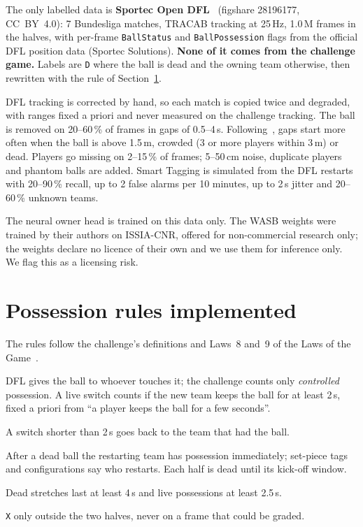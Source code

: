 \documentclass[11pt,a4paper]{article}
\newcommand{\code}[1]{\texttt{#1}}
\begin{document}
The only labelled data is \textbf{Sportec Open DFL}~\cite{dfl} (figshare 28196177, CC~BY~4.0): 7
Bundesliga matches, TRACAB tracking at 25\,Hz, 1.0\,M frames in the halves, with per-frame
\code{BallStatus} and \code{BallPossession} flags from the official DFL position data (Sportec
Solutions). \textbf{None of it comes from the challenge game.} Labels are \code{D} where the ball is
dead and the owning team otherwise, then rewritten with the rule of Section~\ref{sec:rules}.

DFL tracking is corrected by hand, so each match is copied twice and degraded, with ranges fixed a
priori and never measured on the challenge tracking. The ball is removed on 20--60\,\% of frames in
gaps of 0.5--4\,s. Following~\cite{rubin1976}, gaps start more often when the ball is above 1.5\,m,
crowded (3 or more players within 3\,m) or dead. Players go missing on 2--15\,\% of frames; 5--50\,cm
noise, duplicate players and phantom balls are added. Smart Tagging is simulated from the DFL
restarts with 20--90\,\% recall, up to 2 false alarms per 10 minutes, up to 2\,s jitter and 20--60\,\%
unknown teams.

The neural owner head is trained on this data only. The WASB weights were trained by their authors on
ISSIA-CNR, offered for non-commercial research only; the weights declare no licence of their own and
we use them for inference only. We flag this as a licensing risk.

\section{Possession rules implemented}
\label{sec:rules}

The rules follow the challenge's definitions and Laws~8 and~9 of the Laws of the Game~\cite{ifab}.
\begin{description}[leftmargin=1.2em,itemsep=1pt]
  \item[Change of possession.] DFL gives the ball to whoever touches it; the challenge counts only
    \emph{controlled} possession. A live switch counts if the new team keeps the ball for at least
    2\,s, fixed a priori from ``a player keeps the ball for a few seconds''.
  \item[Loose balls, touches, deflections, lost aerial duels.] A switch shorter than 2\,s goes back
    to the team that had the ball.
  \item[Restarts.] After a dead ball the restarting team has possession immediately; set-piece tags
    and configurations say who restarts. Each half is dead until its kick-off window.
  \item[Durations.] Dead stretches last at least 4\,s and live possessions at least 2.5\,s.
  \item[Abstention.] \code{X} only outside the two halves, never on a frame that could be graded.
\end{description}
\end{document}
